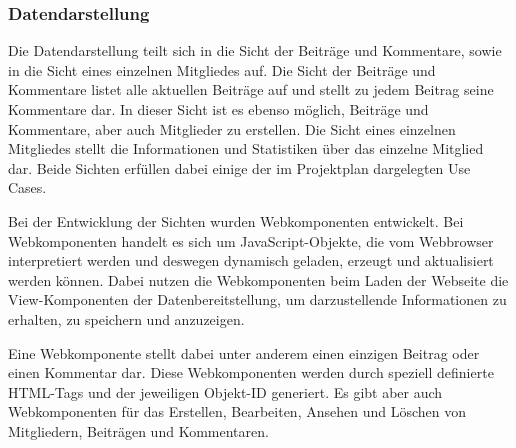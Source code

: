 \subsubsection{Datendarstellung}\label{Datendarstellung}

Die Datendarstellung teilt sich in die Sicht der Beiträge und Kommentare, sowie in die Sicht eines einzelnen Mitgliedes auf. Die Sicht der Beiträge und Kommentare listet alle aktuellen Beiträge auf und stellt zu jedem Beitrag seine Kommentare dar. In dieser Sicht ist es ebenso möglich, Beiträge und Kommentare, aber auch Mitglieder zu erstellen. Die Sicht eines einzelnen Mitgliedes stellt die Informationen und Statistiken über das einzelne Mitglied dar. Beide Sichten erfüllen dabei einige der im Projektplan dargelegten Use Cases.

Bei der Entwicklung der Sichten wurden Webkomponenten entwickelt. Bei Webkomponenten handelt es sich um JavaScript-Objekte, die vom Webbrowser interpretiert werden und deswegen dynamisch geladen, erzeugt und aktualisiert werden können. Dabei nutzen die Webkomponenten beim Laden der Webseite die View-Komponenten der Datenbereitstellung, um darzustellende Informationen zu erhalten, zu speichern und anzuzeigen.

Eine Webkomponente stellt dabei unter anderem einen einzigen Beitrag oder einen Kommentar dar. Diese Webkomponenten werden durch speziell definierte HTML-Tags und der jeweiligen Objekt-ID generiert. Es gibt aber auch Webkomponenten für das Erstellen, Bearbeiten, Ansehen und Löschen von Mitgliedern, Beiträgen und Kommentaren.

